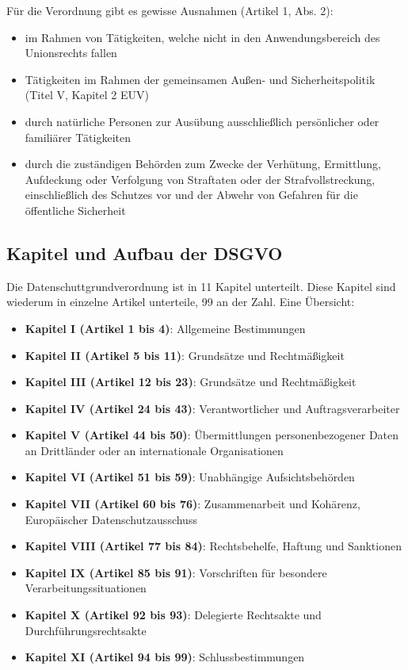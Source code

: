 Für die Verordnung gibt es gewisse Ausnahmen (Artikel 1, Abs. 2):
\begin{itemize}
	\item im Rahmen von Tätigkeiten, welche nicht in den Anwendungsbereich des Unionsrechts fallen
	\item Tätigkeiten im Rahmen der gemeinsamen Außen- und Sicherheitspolitik (Titel V, Kapitel 2 EUV)
	\item durch natürliche Personen zur Ausübung ausschließlich persönlicher oder familiärer Tätigkeiten
	\item durch die zuständigen Behörden zum Zwecke der Verhütung, Ermittlung, Aufdeckung oder Verfolgung von Straftaten oder der Strafvollstreckung, einschließlich des Schutzes vor und der Abwehr von Gefahren für die öffentliche Sicherheit
\end{itemize}

\subsection{Kapitel und Aufbau der DSGVO}
Die Datenschuttgrundverordnung ist in 11 Kapitel unterteilt. Diese Kapitel sind wiederum in einzelne Artikel unterteile, 99 an der Zahl. Eine Übersicht:

\begin{itemize}
	\item \textbf{Kapitel I (Artikel 1 bis 4)}: Allgemeine Bestimmungen
	\item \textbf{Kapitel II (Artikel 5 bis 11)}: Grundsätze und Rechtmäßigkeit
	\item \textbf{Kapitel III (Artikel 12 bis 23)}: Grundsätze und Rechtmäßigkeit
	\item \textbf{Kapitel IV (Artikel 24 bis 43)}: Verantwortlicher und Auftragsverarbeiter
	\item \textbf{Kapitel V (Artikel 44 bis 50)}: Übermittlungen personenbezogener Daten an Drittländer oder an internationale Organisationen
	\item \textbf{Kapitel VI (Artikel 51 bis 59)}: Unabhängige Aufsichtsbehörden
	\item \textbf{Kapitel VII (Artikel 60 bis 76)}: Zusammenarbeit und Kohärenz, Europäischer Datenschutzausschuss
	\item \textbf{Kapitel VIII (Artikel 77 bis 84)}: Rechtsbehelfe, Haftung und Sanktionen
	\item \textbf{Kapitel IX (Artikel 85 bis 91)}: Vorschriften für besondere Verarbeitungssituationen
	\item \textbf{Kapitel X (Artikel 92 bis 93)}: Delegierte Rechtsakte und Durchführungsrechtsakte
	\item \textbf{Kapitel XI (Artikel 94 bis 99)}: Schlussbestimmungen
\end{itemize}

